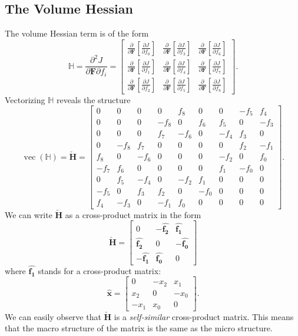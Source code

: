 \subsection{The Volume Hessian}
The volume Hessian term is of the form
\[
\mathbb{H} = \frac{\partial^2 J}{\partial \mathbf{F} \partial f_i} = \left[\begin{array}{ccc}{\frac{\partial}{\partial \mathbf{F}}\left[\frac{\partial J}{\partial f_0}\right]} & {\frac{\partial}{\partial \mathbf{F}}\left[\frac{\partial J}{\partial f_3}\right]} & {\frac{\partial}{\partial \mathbf{F}}\left[\frac{\partial J}{\partial f_6}\right]} \\ {\frac{\partial}{\partial \mathbf{F}}\left[\frac{\partial J}{\partial f_1}\right]} & {\frac{\partial}{\partial \mathbf{F}}\left[\frac{\partial J}{\partial f_4}\right]} & {\frac{\partial}{\partial \mathbf{F}}\left[\frac{\partial J}{\partial f_7}\right]} \\ {\frac{\partial}{\partial \mathbf{F}}\left[\frac{\partial J}{\partial f_2}\right]} & {\frac{\partial}{\partial \mathbf{F}}\left[\frac{\partial J}{\partial f_5}\right]} & {\frac{\partial}{\partial \mathbf{F}}\left[\frac{\partial J}{\partial f_8}\right]} \end{array}\right].
\]
Vectorizing $\mathbb{H}$ reveals the structure
\[
\operatorname{vec}(\mathbb{H}) = \mathbf{\check{H}} = \begin{bmatrix} 0 & 0 & 0 & 0 & f_8 & 0 & 0 & -f_5 & f_4 \\ 0 & 0 & 0 & -f_8 & 0 & f_6 & f_5 & 0 & -f_3 \\ 0 & 0 & 0 & f_7 & -f_6 & 0 & -f_4 & f_3 & 0 \\ 0 & -f_8 & f_7 & 0 & 0 & 0 & 0 & f_2 & -f_1 \\ f_8 & 0 & -f_6 & 0 & 0 & 0 & -f_2 & 0 & f_0 \\ -f_7 & f_6 & 0 & 0 & 0 & 0 & f_1 & -f_0 & 0 \\ 0 & f_5 & -f_4 & 0 & -f_2 & f_1 & 0 & 0 & 0 \\ -f_5 & 0 & f_3 & f_2 & 0 & -f_0 & 0 & 0 & 0 \\ f_4 & -f_3 & 0 & -f_1 & f_0 & 0 & 0 & 0 & 0 \end{bmatrix}.
\]
We can write $\mathbf{\check{H}}$ as a cross-product matrix in the form
\[
\mathbf{\check{H}} = \left[ \begin{matrix}
0 & -\mathbf{\widehat{f_2}} & \mathbf{\widehat{f_1}} \\ \mathbf{\widehat{f_2}} & 0 & -\mathbf{\widehat{f_0}} \\ -\mathbf{\widehat{f_1}} & \mathbf{\widehat{f_0}} & 0 \end{matrix} \right]
\]
where $\mathbf{\widehat{f_1}}$ stands for a cross-product matrix:
\[
\mathbf{\widehat{x}} = \left[ \begin{matrix}
0 & -x_2 & x_1 \\ x_2 & 0 & -x_0 \\ -x_1 & x_0 & 0 \end{matrix} \right].
\]
We can easily observe that $\mathbf{\check{H}}$ is a \textit{self-similar} cross-product matrix. This means that  the macro structure of the matrix is the same as the micro structure.


